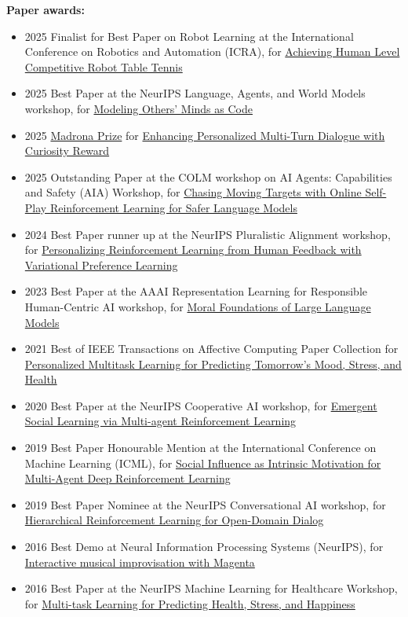 \documentclass[paper=letter,fontsize=11pt]{scrartcl} %
\begin{document}
\noindent \textbf{Paper awards:}
\begin{itemize}
\item 2025 Finalist for Best Paper on Robot Learning at the International Conference on Robotics and Automation (ICRA), for \href{https://arxiv.org/abs/2408.03906}{Achieving Human Level Competitive Robot Table Tennis}
\item 2025 Best Paper at the NeurIPS Language, Agents, and World Models
workshop, for \href{https://arxiv.org/abs/2510.01272}{Modeling Others' Minds as Code}
\item 2025 \href{https://www.madrona.com/madrona-prize-2025-celebrating-innovation-allen-school-research-showcase/}{Madrona Prize} for \href{https://arxiv.org/abs/2504.03206}{Enhancing Personalized Multi-Turn Dialogue with Curiosity Reward}
\item 2025 Outstanding Paper at the COLM workshop on AI Agents: Capabilities and Safety (AIA) Workshop, for \href{https://arxiv.org/abs/2506.07468}{Chasing Moving Targets with Online Self-Play Reinforcement Learning for Safer Language Models}
\item 2024 Best Paper runner up at the NeurIPS Pluralistic Alignment workshop, for \href{https://arxiv.org/abs/2408.10075}{Personalizing Reinforcement Learning from Human Feedback with Variational Preference Learning}
\item 2023 Best Paper at the AAAI Representation Learning for Responsible Human-Centric AI workshop, for \href{https://arxiv.org/abs/2310.15337}{Moral Foundations of Large Language Models}
\item 2021 Best of IEEE Transactions on Affective Computing Paper Collection for \href{https://pmc.ncbi.nlm.nih.gov/articles/PMC7266106/}{Personalized Multitask Learning for Predicting Tomorrow's Mood, Stress, and Health}%
\item 2020 Best Paper at the NeurIPS Cooperative AI workshop, for \href{https://arxiv.org/abs/2010.00581}{Emergent Social Learning via Multi-agent Reinforcement Learning}
\item 2019 Best Paper Honourable Mention at the International Conference on Machine Learning (ICML), for \href{https://arxiv.org/abs/1810.08647}{Social Influence as Intrinsic Motivation for Multi-Agent Deep Reinforcement Learning}
\item 2019 Best Paper Nominee at the NeurIPS Conversational AI workshop, for \href{https://arxiv.org/abs/1909.07547}{Hierarchical Reinforcement Learning for Open-Domain Dialog}
\item 2016 Best Demo at Neural Information Processing Systems (NeurIPS), for \href{https://neurips.cc/virtual/2016/demonstration/6307}{Interactive musical improvisation with Magenta}
\item 2016 Best Paper at the NeurIPS Machine Learning for Healthcare Workshop, for \href{https://www.semanticscholar.org/paper/Multi-task-Learning-for-Predicting-Health-%2C-Stress-Jaques-Taylor/b2287a406985980515d5cc63e9b37fb17c5186f8?p2df}{Multi-task Learning for Predicting Health, Stress, and Happiness}
\end{itemize}
\end{document}
